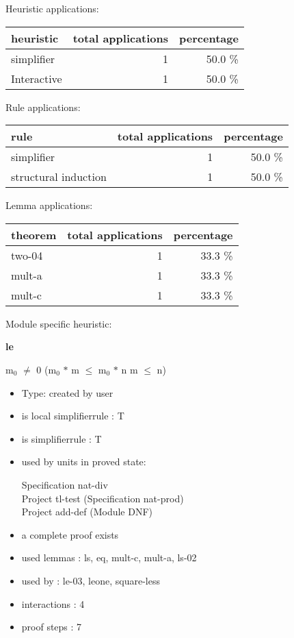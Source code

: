 \documentclass[a4paper]{article}
\begin{document}
\medskip


Heuristic applications:

\begin{supertabular}{l|r|r}
heuristic	& total applications & percentage \\ \hline
simplifier & 1 & 50.0 \% \\
Interactive & 1 & 50.0 \% \\

\end{supertabular}

Rule applications:

\begin{supertabular}{l|r|r}
rule	        & total applications & percentage \\ \hline
simplifier & 1 & 50.0 \% \\
structural induction & 1 & 50.0 \% \\

\end{supertabular}

Lemma applications:

\begin{supertabular}{l|r|r}
theorem	        & total applications & percentage \\ \hline
two-04 & 1 & 33.3 \% \\
mult-a & 1 & 33.3 \% \\
mult-c & 1 & 33.3 \% \\

\end{supertabular}

Module specific heuristic:

\pagebreak

{\LARGE\bf le}\label{lemma-le}

\medskip

 \Fol $\mbox{m}_{0}$ $\neq$ 0 \Imp ($\mbox{m}_{0}$ $*$ m $\le$ $\mbox{m}_{0}$ $*$ n \Equiv m $\le$ n)

\begin{itemize}

\item Type: created by user

\item is local simplifierrule : T
\item is simplifierrule : T
\item used by units in proved state:

Specification nat-div \\
Project tl-test (Specification nat-prod) \\
Project add-def (Module DNF)
\item       a complete proof exists
\item       used lemmas  : ls, eq, mult-c, mult-a, ls-02
\item       used by      : le-03, leone, square-less
\item       interactions : 4
\item       proof steps  : 7
\end{itemize}
\end{document}
